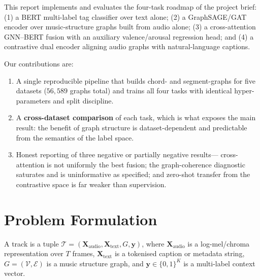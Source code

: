 \documentclass{article}
\begin{document}
This report implements and evaluates the four-task roadmap of the project brief:
(1) a BERT multi-label tag classifier over text alone; (2) a GraphSAGE/GAT encoder
over music-structure graphs built from audio alone; (3) a cross-attention
GNN--BERT fusion with an auxiliary valence/arousal regression head; and (4) a
contrastive dual encoder aligning audio graphs with natural-language captions.

Our contributions are:
\begin{enumerate}
  \item A single reproducible pipeline that builds chord- and segment-graphs for
        five datasets ($56{,}589$ graphs total) and trains all four tasks with
        identical hyper-parameters and split discipline.
  \item A \textbf{cross-dataset comparison} of each task, which is what exposes the
        main result: the benefit of graph structure is dataset-dependent and
        predictable from the semantics of the label space.
  \item Honest reporting of three negative or partially negative results---%
        cross-attention is not uniformly the best fusion; the graph-coherence
        diagnostic saturates and is uninformative as specified; and zero-shot
        transfer from the contrastive space is far weaker than supervision.
\end{enumerate}

\section{Problem Formulation}

A track is a tuple $\mathcal{T} = (\mathbf{X}_{\text{audio}},
\mathbf{X}_{\text{text}}, G, \mathbf{y})$, where $\mathbf{X}_{\text{audio}}$ is a
log-mel/chroma representation over $T$ frames, $\mathbf{X}_{\text{text}}$ is a
tokenised caption or metadata string, $G = (\mathcal{V},\mathcal{E})$ is a music
structure graph, and $\mathbf{y} \in \{0,1\}^K$ is a multi-label context vector.
\end{document}
